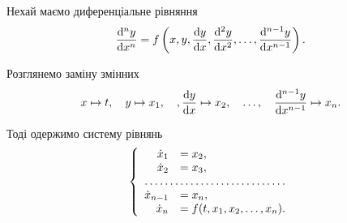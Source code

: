 Нехай маємо диференціальне рівняння
\begin{equation*}
 	\frac{\diff^n y}{\diff x^n} = f \left( x, y, \frac{\diff y}{\diff x}, \frac{\diff^2 y}{\diff x^2}, \ldots, \frac{\diff^{n - 1} y}{\diff x^{n - 1}} \right).
\end{equation*}

Розглянемо заміну змінних
\begin{equation*}
	x \mapsto t, \quad y \mapsto x_1, \quad, \frac{\mathop{}\!\mathrm{d} y}{\mathop{}\!\mathrm{d} x} \mapsto x_2, \quad \ldots, \quad \frac{\mathop{}\!\mathrm{d}^{n - 1} y}{\mathop{}\!\mathrm{d} x^{n - 1}} \mapsto x_n.
\end{equation*}

Тоді одержимо систему рівнянь
\begin{equation*}
	\left\{
		\begin{array}{rl}
			\dot x_1 &= x_2, \\
			\dot x_2 &= x_3, \\
			\hdotsfor{2} \\
			\dot x_{n - 1} &= x_n, \\
			\dot x_n &= f(t, x_1, x_2, \ldots, x_n).
		\end{array}
	\right.
\end{equation*}